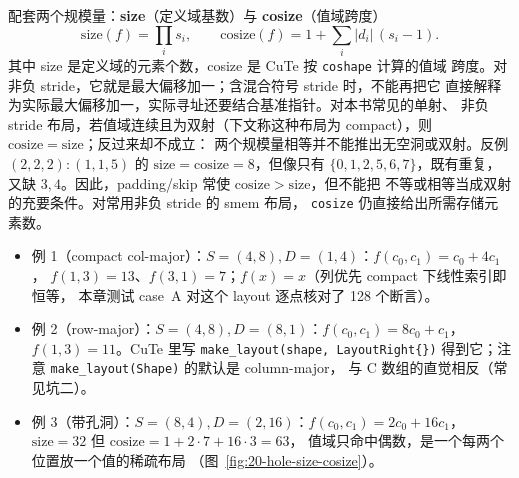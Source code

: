 配套两个规模量：\textbf{size}（定义域基数）与 \textbf{cosize}（值域跨度）
\begin{equation}
  \mathrm{size}(f) = \prod_i s_i , \qquad
  \mathrm{cosize}(f) = 1 + \sum_i |d_i|\,(s_i - 1) .
  \label{eq:20-size-cosize}
\end{equation}
其中 size 是定义域的元素个数，cosize 是 CuTe 按 \texttt{coshape} 计算的值域
跨度。对非负 stride，它就是最大偏移加一；含混合符号 stride 时，不能再把它
直接解释为实际最大偏移加一，实际寻址还要结合基准指针。对本书常见的单射、
非负 stride 布局，若值域连续且为双射（下文称这种布局为 compact），则
$\mathrm{cosize}=\mathrm{size}$；反过来却不成立：
两个规模量相等并不能推出无空洞或双射。反例 $(2,2,2){:}(1,1,5)$ 的
$\mathrm{size}=\mathrm{cosize}=8$，但像只有 $\{0,1,2,5,6,7\}$，既有重复，
又缺 $3,4$。因此，padding/skip 常使 $\mathrm{cosize}>\mathrm{size}$，但不能把
不等或相等当成双射的充要条件。对常用非负 stride 的 smem 布局，
\texttt{cosize} 仍直接给出所需存储元素数。

\begin{itemize}
  \item 例 1（compact col-major）：$S=(4,8),D=(1,4)$：$f(c_0,c_1)=c_0+4c_1$，
        $f(1,3)=13$、$f(3,1)=7$；$f(x)=x$（列优先 compact 下线性索引即恒等，
        本章测试 case~A 对这个 layout 逐点核对了 128 个断言）。
  \item 例 2（row-major）：$S=(4,8),D=(8,1)$：$f(c_0,c_1)=8c_0+c_1$，
        $f(1,3)=11$。CuTe 里写 \texttt{make\_\allowbreak{}layout\allowbreak{}(shape,\allowbreak{} Layout\allowbreak{}Right\{\})}
        得到它；注意 \texttt{make\_\allowbreak{}layout\allowbreak{}(Shape)} 的默认是 column-major，
        与 C 数组的直觉相反（常见坑二）。
  \item 例 3（带孔洞）：$S=(8,4),D=(2,16)$：$f(c_0,c_1)=2c_0+16c_1$，
        $\mathrm{size}=32$ 但 $\mathrm{cosize}=1+2\cdot7+16\cdot3=63$，
        值域只命中偶数，是一个每两个位置放一个值的稀疏布局
        （图~\ref{fig:20-hole-size-cosize}）。
\end{itemize}

